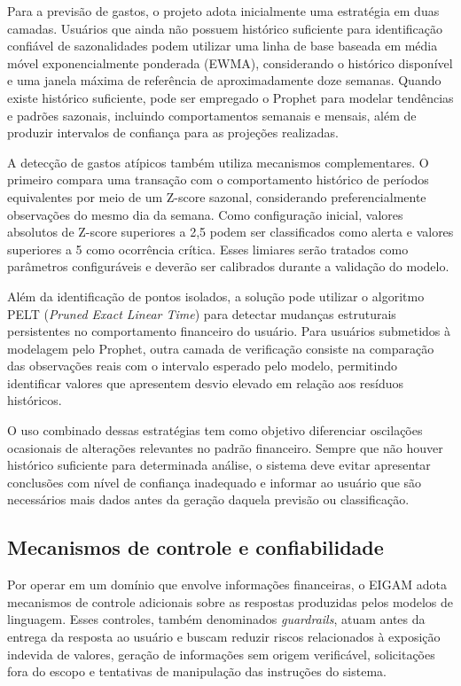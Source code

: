 Para a previsão de gastos, o projeto adota inicialmente uma estratégia em duas camadas. Usuários que ainda não possuem histórico suficiente para identificação confiável de sazonalidades podem utilizar uma linha de base baseada em média móvel exponencialmente ponderada (EWMA), considerando o histórico disponível e uma janela máxima de referência de aproximadamente doze semanas. Quando existe histórico suficiente, pode ser empregado o Prophet para modelar tendências e padrões sazonais, incluindo comportamentos semanais e mensais, além de produzir intervalos de confiança para as projeções realizadas.

A detecção de gastos atípicos também utiliza mecanismos complementares. O primeiro compara uma transação com o comportamento histórico de períodos equivalentes por meio de um Z-score sazonal, considerando preferencialmente observações do mesmo dia da semana. Como configuração inicial, valores absolutos de Z-score superiores a 2,5 podem ser classificados como alerta e valores superiores a 5 como ocorrência crítica. Esses limiares serão tratados como parâmetros configuráveis e deverão ser calibrados durante a validação do modelo.

Além da identificação de pontos isolados, a solução pode utilizar o algoritmo PELT (\textit{Pruned Exact Linear Time}) para detectar mudanças estruturais persistentes no comportamento financeiro do usuário. Para usuários submetidos à modelagem pelo Prophet, outra camada de verificação consiste na comparação das observações reais com o intervalo esperado pelo modelo, permitindo identificar valores que apresentem desvio elevado em relação aos resíduos históricos.

O uso combinado dessas estratégias tem como objetivo diferenciar oscilações ocasionais de alterações relevantes no padrão financeiro. Sempre que não houver histórico suficiente para determinada análise, o sistema deve evitar apresentar conclusões com nível de confiança inadequado e informar ao usuário que são necessários mais dados antes da geração daquela previsão ou classificação.

\subsection{Mecanismos de controle e confiabilidade}

Por operar em um domínio que envolve informações financeiras, o EIGAM adota mecanismos de controle adicionais sobre as respostas produzidas pelos modelos de linguagem. Esses controles, também denominados \textit{guardrails}, atuam antes da entrega da resposta ao usuário e buscam reduzir riscos relacionados à exposição indevida de valores, geração de informações sem origem verificável, solicitações fora do escopo e tentativas de manipulação das instruções do sistema.

